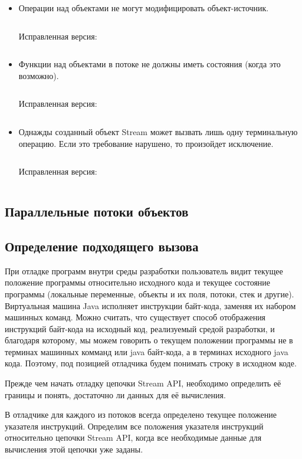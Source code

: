 \begin{itemize}
	\item Операции над объектами не могут модифицировать объект-источник.
	\inputminted{java}{chapter2/code/SourceModification.java}
	Исправленная версия:
	\inputminted{java}{chapter2/code/SourceModificationFixed.java}
	\item Функции над объектами в потоке не должны иметь состояния (когда это возможно).
	\inputminted{java}{chapter2/code/StatefulOperation.java}
	Исправленная версия:
	\inputminted{java}{chapter2/code/StatefulOperationFixed.java}
	\item Однажды созданный объект Stream может вызвать лишь одну терминальную операцию. Если это требование нарушено, то произойдет исключение.
	\inputminted{java}{chapter2/code/OneTermination.java}
	Исправленная версия:
	\inputminted{java}{chapter2/code/OneTerminationFixed.java}
\end{itemize}

\subsection{Параллельные потоки объектов}


\subsection{Определение подходящего вызова} \label{detection}
При отладке программ внутри среды разработки пользователь видит текущее положение программы относительно исходного кода и текущее состояние программы (локальные переменные, объекты и их поля, потоки, стек и другие). Виртуальная машина Java исполняет инструкции байт-кода, заменяя их набором машинных команд. Можно считать, что существует способ отображения инструкций байт-кода на исходный код, реализуемый средой разработки, и благодаря которому, мы можем говорить о текущем положении программы не в терминах машинных комманд или java байт-кода, а в терминах исходного java кода. Поэтому, под позицией отладчика будем понимать строку в исходном коде.

Прежде чем начать отладку цепочки Stream API, необходимо определить её границы и понять, достаточно ли данных для её вычисления.

В отладчике для каждого из потоков всегда определено текущее положение указателя инструкций.  Определим все положения указателя инструкций относительно цепочки Stream API, когда все необходимые данные для вычисления этой цепочки уже заданы.

